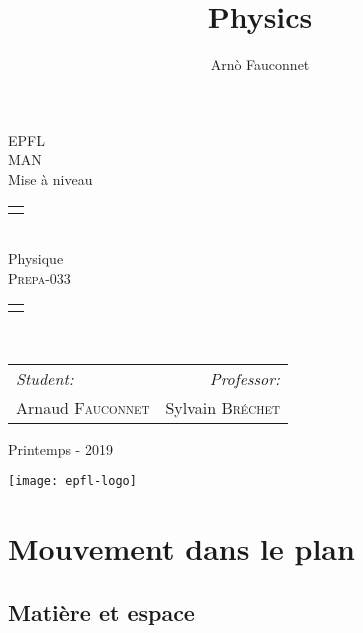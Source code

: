 \documentclass[
    11pt,
    a4paper,
    oneside,
    headinlcude, footinclude,
    twoside,
]{report}
\title{Physics}
\author{Arnò Fauconnet}
\begin{document}
\begin{titlepage}
   \begin{center}
       \vspace*{\fill}

       {\Huge EPFL}\\ 
       \vfill
       {\huge MAN}\\ [1em]
       {\Large Mise à niveau}\\
        \vfill
        \begin{tabularx}{\textwidth}{X}
            \Xhline{3\arrayrulewidth}\\
        \end{tabularx}\\ [2em]
        {\Huge Physique} \\ [1em]
        \textsc{\huge Prepa-033} \\ [2em]
        \begin{tabularx}{\textwidth}{X}
            \Xhline{3\arrayrulewidth}\\
        \end{tabularx}\\ [2em]
        \vspace{.7cm}
        {\large
        \begin{tabularx}{.9\textwidth}{Xr}
            \textit{Student:} & \textit{Professor:}\\
            Arnaud \textsc{Fauconnet} & Sylvain \textsc{Bréchet}
        \end{tabularx}}
        \vfill
        {\Large Printemps - 2019}

        \vfill
        \texttt{[image: epfl-logo]}

       \vfill
   \end{center} 
\end{titlepage} 
\setcounter{chapter}{1}
\chapter{Mouvement dans le plan}

\section{Matière et espace}
\label{sec:matiere_et_espace}
\end{document}
